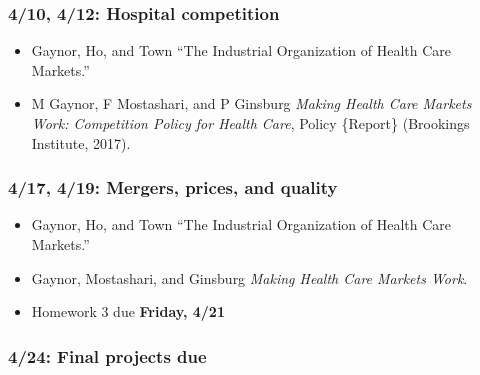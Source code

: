 \documentclass[11pt,]{article}
\providecommand{\tightlist}{%
  \setlength{\itemsep}{0pt}\setlength{\parskip}{0pt}}
\begin{document}
\hypertarget{hospital-competition}{%
\subsubsection{4/10, 4/12: Hospital
competition}\label{hospital-competition}}

\begin{itemize}
\tightlist
\item
  Gaynor, Ho, and Town {``The {Industrial} {Organization} of {Health}
  {Care} {Markets}.''}
\item
  M Gaynor, F Mostashari, and P Ginsburg \emph{Making Health Care
  Markets Work: {Competition} Policy for Health Care}, Policy \{Report\}
  (Brookings Institute, 2017).
\end{itemize}

\hypertarget{mergers-prices-and-quality}{%
\subsubsection{4/17, 4/19: Mergers, prices, and
quality}\label{mergers-prices-and-quality}}

\begin{itemize}
\tightlist
\item
  Gaynor, Ho, and Town {``The {Industrial} {Organization} of {Health}
  {Care} {Markets}.''}
\item
  Gaynor, Mostashari, and Ginsburg \emph{Making Health Care Markets
  Work}.
\item
  Homework 3 due \textbf{Friday, 4/21}
\end{itemize}

\hypertarget{final-projects-due}{%
\subsubsection{4/24: Final projects due}\label{final-projects-due}}
\end{document}
